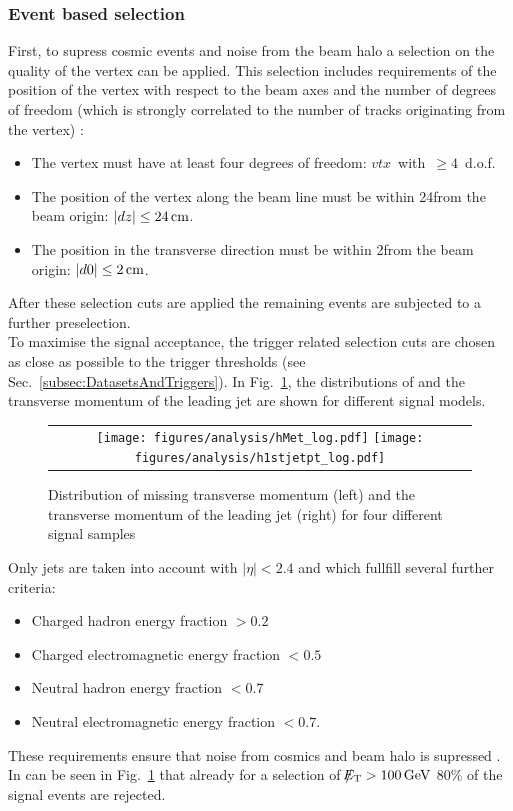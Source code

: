 \subsubsection*{Event based selection}
First, to supress cosmic events and noise from the beam halo a selection on the quality of the vertex can be applied.
This selection includes requirements of the position of the vertex with respect to the beam axes and the number of degrees of freedom (which is strongly correlated to the number of tracks originating from the vertex) \cite{bib:CMS:Tracking_7TeV_PAS}:  
\begin{itemize}
\renewcommand{\labelitemi}{\footnotesize{\ding{118}}}
\item The vertex must have at least four degrees of freedom: \mbox{$vtx$ with $\geq 4$ d.o.f.}
\item The position of the vertex along the beam line must be within 24\cm from the beam origin: \mbox{$|dz| \leq 24\,\text{cm}$.}
\item The position in the transverse direction must be within 2\cm from the beam origin: \mbox{$|d0| \leq 2\,\text{cm}$.}
\end{itemize}
After these selection cuts are applied the remaining events are subjected to a further preselection.\\


To maximise the signal acceptance, the trigger related selection cuts are chosen as close as possible to the trigger thresholds (see Sec.~\ref{subsec:DatasetsAndTriggers}).
In Fig.~\ref{fig:SignalMET+SignalJetPt}, the distributions of \met and the transverse momentum of the leading jet \ptfirstjet are shown for different signal models.
\begin{figure}[!b]
  \centering 
  \begin{tabular}{c}
    \texttt{[image: figures/analysis/hMet\_log.pdf]}
    \texttt{[image: figures/analysis/h1stjetpt\_log.pdf]}
  \end{tabular}
  \caption{Distribution of missing transverse momentum (left) and the transverse momentum of the leading jet (right) for four different signal samples}
  \label{fig:SignalMET+SignalJetPt}
\end{figure}
Only jets are taken into account with $|\eta|<2.4$ and which fullfill several further criteria:
\begin{itemize}
\item Charged hadron energy fraction $>0.2$
\item Charged electromagnetic energy fraction $<0.5$
\item Neutral hadron energy fraction $<0.7$
\item Neutral electromagnetic energy fraction $<0.7$.
\end{itemize}
These requirements ensure that noise from cosmics and beam halo is supressed \cite{bib:CMS:DM_8TeV_AN}.
In can be seen in Fig.~\ref{fig:SignalMET+SignalJetPt} that already for a selection of $\slash\mkern-12mu{E}_{\text{T}}>100\,\text{Ge}\kern-0.06667em\text{V}$ 80\% of the signal events are rejected.

